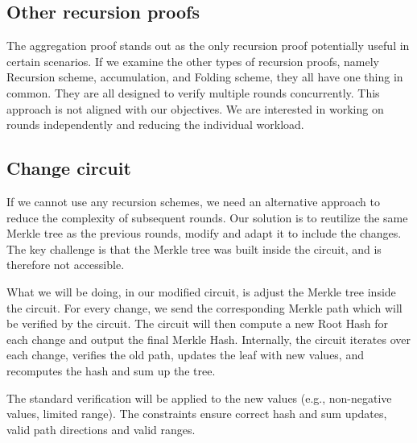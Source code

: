 \subsection{Other recursion proofs}
The aggregation proof stands out as the only recursion proof potentially useful in certain scenarios.
If we examine the other types of recursion proofs, namely Recursion scheme, accumulation, and Folding scheme, they all have one thing in common.
They are all designed to verify multiple rounds concurrently.
This approach is not aligned with our objectives. We are interested in working on rounds independently and reducing the individual workload.

\subsection{Change circuit}
If we cannot use any recursion schemes, we need an alternative approach to reduce the complexity of subsequent rounds.
Our solution is to reutilize the same Merkle tree as the previous rounds, modify and adapt it to include the changes.
The key challenge is that the Merkle tree was built inside the circuit, and is therefore not accessible.

What we will be doing, in our modified circuit, is adjust the Merkle tree inside the circuit.
For every change, we send the corresponding Merkle path which will be verified by the circuit.
The circuit will then compute a new Root Hash for each change and output the final Merkle Hash. 
Internally, the circuit iterates over each change, verifies the old path, updates the leaf with new values, and recomputes the hash and sum up the tree.

The standard verification will be applied to the new values (e.g., non-negative values, limited range).
The constraints ensure correct hash and sum updates, valid path directions and valid ranges.

